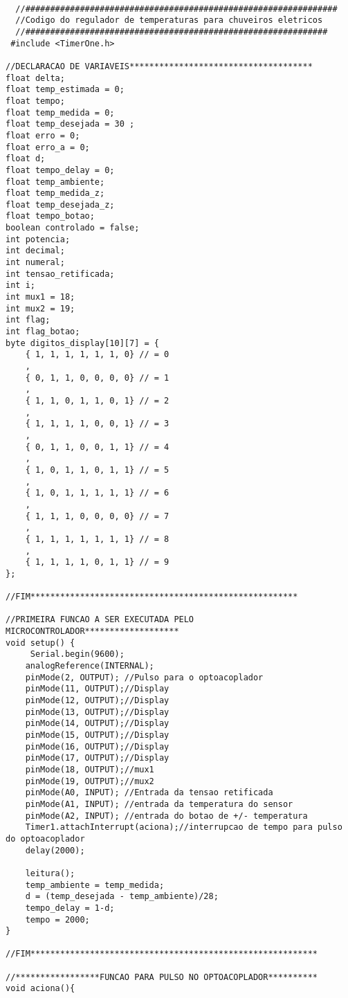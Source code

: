 \begin{lstlisting}
    
  //###############################################################
  //Codigo do regulador de temperaturas para chuveiros eletricos
  //#############################################################
 #include <TimerOne.h>
 
//DECLARACAO DE VARIAVEIS*************************************
float delta;
float temp_estimada = 0;
float tempo;
float temp_medida = 0;
float temp_desejada = 30 ;
float erro = 0;
float erro_a = 0;
float d;
float tempo_delay = 0;
float temp_ambiente;
float temp_medida_z;
float temp_desejada_z;
float tempo_botao;
boolean controlado = false;
int potencia;
int decimal;
int numeral;
int tensao_retificada;
int i;
int mux1 = 18;
int mux2 = 19;
int flag;
int flag_botao;
byte digitos_display[10][7] = {
    { 1, 1, 1, 1, 1, 1, 0} // = 0
    ,
    { 0, 1, 1, 0, 0, 0, 0} // = 1
    ,
    { 1, 1, 0, 1, 1, 0, 1} // = 2
    ,
    { 1, 1, 1, 1, 0, 0, 1} // = 3
    ,
    { 0, 1, 1, 0, 0, 1, 1} // = 4
    ,
    { 1, 0, 1, 1, 0, 1, 1} // = 5
    ,
    { 1, 0, 1, 1, 1, 1, 1} // = 6
    ,
    { 1, 1, 1, 0, 0, 0, 0} // = 7
    ,
    { 1, 1, 1, 1, 1, 1, 1} // = 8
    ,
    { 1, 1, 1, 1, 0, 1, 1} // = 9
};

//FIM******************************************************

//PRIMEIRA FUNCAO A SER EXECUTADA PELO MICROCONTROLADOR*******************
void setup() {
     Serial.begin(9600);
    analogReference(INTERNAL);              
    pinMode(2, OUTPUT); //Pulso para o optoacoplador
    pinMode(11, OUTPUT);//Display
    pinMode(12, OUTPUT);//Display
    pinMode(13, OUTPUT);//Display
    pinMode(14, OUTPUT);//Display
    pinMode(15, OUTPUT);//Display
    pinMode(16, OUTPUT);//Display
    pinMode(17, OUTPUT);//Display
    pinMode(18, OUTPUT);//mux1
    pinMode(19, OUTPUT);//mux2
    pinMode(A0, INPUT); //Entrada da tensao retificada            
    pinMode(A1, INPUT); //entrada da temperatura do sensor
    pinMode(A2, INPUT); //entrada do botao de +/- temperatura   
    Timer1.attachInterrupt(aciona);//interrupcao de tempo para pulso do optoacoplador
    delay(2000);                    
    
    leitura();
    temp_ambiente = temp_medida;
    d = (temp_desejada - temp_ambiente)/28;
    tempo_delay = 1-d;
    tempo = 2000;  
}

//FIM**********************************************************

//*****************FUNCAO PARA PULSO NO OPTOACOPLADOR**********
void aciona(){


\end{lstlisting}
